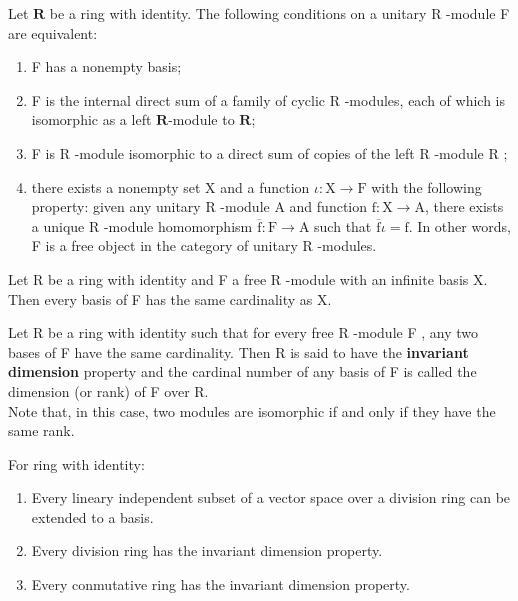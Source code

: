 \begin{theo} Let $\mathbf{R}$ be a ring with identity. The following conditions on a unitary R -module F are equivalent:
    \begin{enumerate}
        \item F has a nonempty basis;
        \item F is the internal direct sum of a family of cyclic R -modules, each of which is isomorphic as a left $\mathbf{R}$-module to $\mathbf{R}$;
        \item F is R -module isomorphic to a direct sum of copies of the left R -module R ;
        \item there exists a nonempty set X and a function $\iota: \mathrm{X} \rightarrow \mathrm{F}$ with the following property: given any unitary R -module A and function $\mathrm{f}: \mathrm{X} \rightarrow \mathrm{A}$, there exists a unique R -module homomorphism $\overline{\mathrm{f}}: \mathrm{F} \rightarrow \mathrm{A}$ such that $\overline{\mathrm{f}} \iota=\mathrm{f}$. In other words, F is a free object in the category of unitary R -modules.
    \end{enumerate}
\end{theo}

\begin{theo}
        Let R be a ring with identity and F a free R -module with an infinite basis X. Then every basis of F has the same cardinality as X.
\end{theo}

Let R be a ring with identity such that for every free R -module F , any two bases of F have the same cardinality. Then R is said to have the \textbf{invariant dimension} property and the cardinal number of any basis of F is called the dimension (or rank) of F over R. \\
Note that, in this case, two modules are isomorphic if and only if they have the same rank.\\

\begin{theo} For ring with identity:
    \begin{enumerate}
        \item Every lineary independent subset of a vector space over a division ring can be extended to a basis.
        \item Every division ring has the invariant dimension property.
        \item Every conmutative ring has the invariant dimension property.
    \end{enumerate}
    \end{theo}

